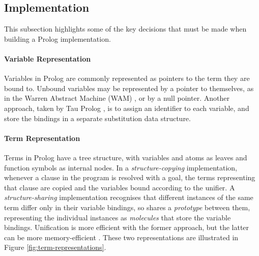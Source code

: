 \subsection{Implementation}

This subsection highlights some of the key decisions that must be made when building a Prolog implementation.

\paragraph{Variable Representation} Variables in Prolog are commonly represented as pointers to the term they are bound to. Unbound variables may be represented by a pointer to themselves, as in the Warren Abstract Machine (WAM) \cite{warrenAbstractPrologInstruction1983}, or by a null pointer. Another approach, taken by Tau Prolog \cite{riazaTauPrologProlog2024}, is to assign an identifier to each variable, and store the bindings in a separate substitution data structure.

\paragraph{Term Representation} Terms in Prolog have a tree structure, with variables and atoms as leaves and function symbols as internal nodes. In a \emph{structure-copying} implementation, whenever a clause in the program is resolved with a goal, the terms representing that clause are copied and the variables bound according to the unifier. A \emph{structure-sharing} implementation recognises that different instances of the same term differ only in their variable bindings, so shares a \emph{prototype} between them, representing the individual instances as \emph{molecules} that store the variable bindings. Unification is more efficient with the former approach, but the latter can be more memory-efficient \cite{linewtermrepresentation1998}. These two representations are illustrated in Figure \ref{fig:term-representations}.

